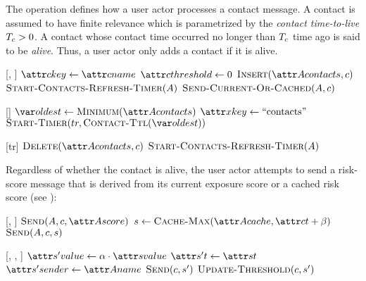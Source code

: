 The \cHandleContactMessage operation defines how a user actor processes a contact message. A contact is assumed to have finite relevance which is parametrized by the \emph{contact time-to-live} $T_c > 0$. A contact whose contact time occurred no longer than $T_c$ time ago is said to be \emph{alive}. Thus, a user actor only adds a contact if it is alive.
%
\begin{function}{\nHandleContactMessage}[\vActor, \vContact]
    	\State $\aContactKey \assign \aContactName$
    	\State $\aContactThreshold \assign 0$
    	\State $\cInsert[\aActorContacts, \vContact]$
    	\State $\cStartContactsRefreshTimer[\vActor]$
    	\State $\cSendCurrentOrCached[\vActor, \vContact]$
    \EndIf
\end{function}
%
\begin{function}{\nStartContactsRefreshTimer}[\vActor]
    \State $\vOldest \assign \cMinimum[\aActorContacts]$
    \If{$\vOldest \notEquals \nil$}
    	\State $\aTimerKey \assign \text{``contacts''}$
    	\State $\cStartTimer[tr, \cContactTtl[\vOldest]]$
    \EndIf
\end{function}
%
\begin{function}{\nHandleContactsRefreshTimer}[tr]
    \ForEach{$\vContact \in \aActorContacts$}
    		\State $\cDelete[\aActorContacts, \vContact]$
    	\EndIf
    \EndFor
    \State $\cStartContactsRefreshTimer[\vActor]$
\end{function}
%
Regardless of whether the contact is alive, the user actor attempts to send a risk-score message that is derived from its current exposure score or a cached risk score (see ):
%
\begin{function}{\nSendCurrentOrCached}[\vActor, \vContact]
    \If{$\cShouldReceive[\vContact, \aActorScore]$} \label{step:send-current}
    	\State $\cSend[\vActor, \vContact, \aActorScore]$
    \Else
    	\State $\vScore \assign \cCacheMax[\aActorCache, \aContactTime + \pTimeBuffer]$ \label{step:cache-max}
    		\State $\cSend[\vActor, \vContact, \vScore]$
    	\EndIf
    \EndIf
\end{function}
%
\begin{function}{\nSend}[\vActor, \vContact, \vScore]
    \State $\aSentScoreValue \assign \pTransRate \cdot \aScoreValue$
    \State $\aSentScoreTime \assign \aScoreTime$
    \State $\aSentScoreSender \assign \aActorName$
    \State $\cSend[\vContact, \vSentScore]$
    \State $\cUpdateThreshold[\vContact, \vSentScore]$
\end{function}
